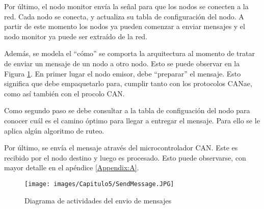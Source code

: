 Por último,  el nodo monitor envía la señal para que los nodos se conecten a
la red. Cada nodo se conecta, y actualiza su tabla de configuración del nodo. A partir
de este momento los nodos ya pueden comenzar a enviar mensajes y el nodo monitor ya
puede ser extraído de la red. 

Además, se modela el ``cómo'' se comporta la arquitectura al
momento de tratar de enviar un mensaje de un nodo a otro nodo. Esto se puede
observar en la Figura \ref{fig:SendMessage}. En primer lugar el nodo emisor,
debe ``preparar'' el mensaje. Esto significa que debe empaquetarlo para,
cumplir tanto con los protocolos CANae, como así también con el procolo CAN.

Como segundo paso se debe consultar a la tabla de configuación del nodo para conocer
cuál es el camino óptimo para llegar a entregar el mensaje. Para ello se le aplica algún
algoritmo de ruteo.

Por último, se envía el mensaje através del microcontrolador CAN. Este es recibido por el nodo
destino y luego es procesado. Esto puede observarse, con mayor detalle en el
apéndice \ref{Appendix:A}. 

\begin{figure}[h!]
 \centering
 \texttt{[image: images/Capitulo5/SendMessage.JPG]}
  \caption{Diagrama de actividades del envio de mensajes}
  \label{fig:SendMessage}
\end{figure}
